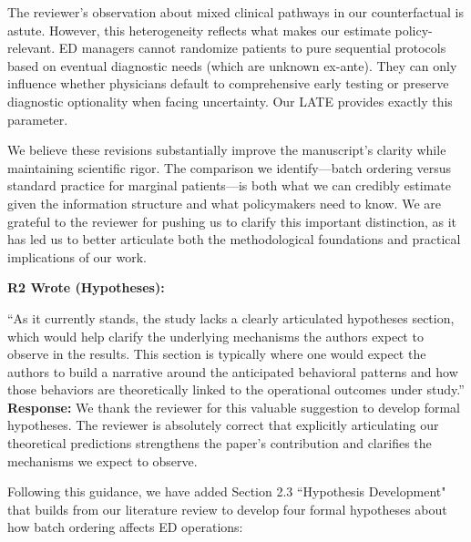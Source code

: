 \documentclass[11pt]{article}
\newenvironment{quote2}
{ \bigskip
\noindent
         \small\em
         \baselineskip=14pt
}
\newcommand{\1}{\hbox{\rm 1\kern-.35em 1}}
\begin{document}
The reviewer's observation about mixed clinical pathways in our counterfactual is astute. However, this heterogeneity reflects what makes our estimate policy-relevant. ED managers cannot randomize patients to pure sequential protocols based on eventual diagnostic needs (which are unknown ex-ante). They can only influence whether physicians default to comprehensive early testing or preserve diagnostic optionality when facing uncertainty. Our LATE provides exactly this parameter.

We believe these revisions substantially improve the manuscript's clarity while maintaining scientific rigor. The comparison we identify—batch ordering versus standard practice for marginal patients—is both what we can credibly estimate given the information structure and what policymakers need to know. We are grateful to the reviewer for pushing us to clarify this important distinction, as it has led us to better articulate both the methodological foundations and practical implications of our work.

\color{black}

\begin{quote2}
\textbf{R2 Wrote (Hypotheses):}  

\noindent``As it currently stands, the study lacks a clearly articulated hypotheses section, which would help clarify the underlying mechanisms the authors expect to observe in the results. This section is typically where one would expect the authors to build a narrative around the anticipated behavioral patterns and how those behaviors are theoretically linked to the operational outcomes under study.” 
\end{quote2}

\noindent\textbf{Response:} \color{blue}We thank the reviewer for this valuable suggestion to develop formal hypotheses. The reviewer is absolutely correct that explicitly articulating our theoretical predictions strengthens the paper's contribution and clarifies the mechanisms we expect to observe.

Following this guidance, we have added Section 2.3 ``Hypothesis Development" that builds from our literature review to develop four formal hypotheses about how batch ordering affects ED operations:
\end{document}
